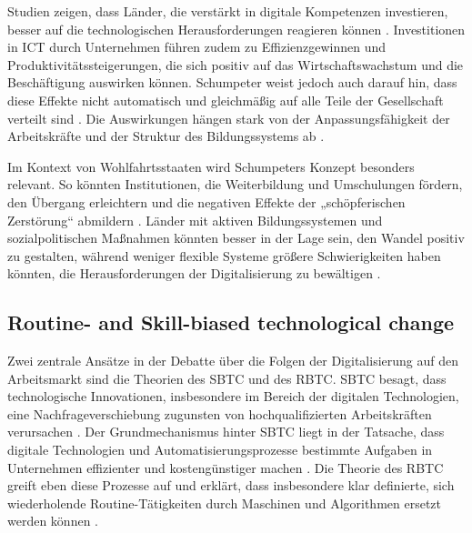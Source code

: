 Studien zeigen, dass Länder, die verstärkt in digitale Kompetenzen investieren, besser auf die 
technologischen Herausforderungen reagieren können \parencite[S. 15–17]{oecd2019measuring}. 
Investitionen in \ac{ICT} durch Unternehmen führen zudem zu Effizienzgewinnen und 
Produktivitätssteigerungen, die sich positiv auf das Wirtschaftswachstum und die Beschäftigung 
auswirken können. Schumpeter weist jedoch auch darauf hin, dass diese Effekte nicht automatisch 
und gleichmäßig auf alle Teile der Gesellschaft verteilt sind 
\parencite[vgl.][S. 90]{schumpeter1976capitalism}. Die Auswirkungen hängen stark von der 
Anpassungsfähigkeit der Arbeitskräfte und der Struktur des Bildungssystems ab 
\parencite[S. 48]{oecd2019measuring}.

Im Kontext von Wohlfahrtsstaaten wird Schumpeters Konzept besonders relevant. So könnten 
Institutionen, die Weiterbildung und Umschulungen fördern, den Übergang erleichtern und die 
negativen Effekte der „schöpferischen Zerstörung“ abmildern 
\parencite[vgl.][S. 29–32]{espingandersen1990thethree}. Länder mit aktiven Bildungssystemen und 
sozialpolitischen Maßnahmen könnten besser in der Lage sein, den Wandel positiv zu gestalten, 
während weniger flexible Systeme größere Schwierigkeiten haben könnten, die Herausforderungen der 
Digitalisierung zu bewältigen \parencite[vgl.][S. 29–32]{espingandersen1990thethree}.


\subsection{Routine- and Skill-biased technological change}

Zwei zentrale Ansätze in der Debatte über die Folgen der Digitalisierung auf den Arbeitsmarkt 
sind die Theorien des \ac{SBTC} und des \ac{RBTC}. \ac{SBTC} besagt, dass technologische 
Innovationen, insbesondere im Bereich der digitalen Technologien, eine Nachfrageverschiebung 
zugunsten von hochqualifizierten Arbeitskräften verursachen 
\parencite[vgl.][S. 1]{violante2008skill}. Der Grundmechanismus hinter \ac{SBTC} liegt in der 
Tatsache, dass digitale Technologien und Automatisierungsprozesse bestimmte Aufgaben in 
Unternehmen effizienter und kostengünstiger machen \parencite[vgl.][S. 2–3]{violante2008skill}. 
Die Theorie des \ac{RBTC} greift eben diese Prozesse auf und erklärt, dass insbesondere klar 
definierte, sich wiederholende Routine-Tätigkeiten durch Maschinen und Algorithmen ersetzt werden 
können \parencite[vgl.][S. 2509–2510]{goos2014explaining}.

